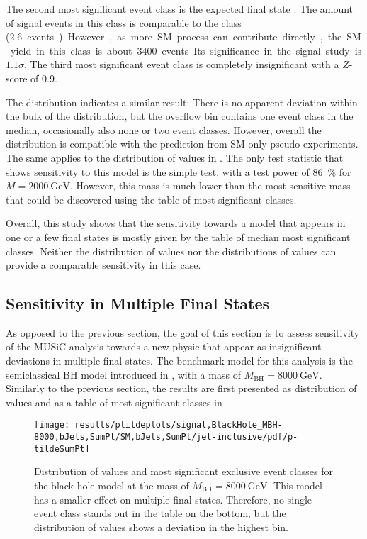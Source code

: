 The second most significant event class is the expected final state . The amount of signal events in this class is comparable to the  class (\SI{2.6} events). However, as more \ac{SM} process can contribute directly, the \ac{SM} yield in this class is about \num{3400} events. Its significance in the signal study is $\num{1.1}\sigma$. 
The third most significant event class is completely insignificant with a $Z$-score of \num{0.9}.

The \ptilde distribution indicates a similar result: There is no apparent deviation within the bulk of the distribution, but the overflow bin contains one event class in the median, occasionally also none or two event classes. However, overall the distribution is compatible with the prediction from \ac{SM}-only pseudo-experiments.
The same applies to the distribution of \TSphat values in . The only test statistic that shows sensitivity to this model is the simple test, with a test power of \SI{86}{\percent} for $M = \SI{2000}{\GeV}$. However, this mass is much lower than the most sensitive mass that could be discovered using the table of most significant classes.

Overall, this study shows that the sensitivity towards a model that appears in one or a few final states is mostly given by the table of median most significant classes. Neither the distribution of \ptilde values nor the distributions of \TSphat values can provide a comparable sensitivity in this case.

\subsection{Sensitivity in Multiple Final States}
As opposed to the previous section, the goal of this section is to assess sensitivity of the \ac{MUSiC} analysis towards a new physic that appear as insignificant deviations in multiple final states. The benchmark model for this analysis is the semiclassical \acl{BH} model introduced in , with a mass of $M_\text{BH} = \SI{8000}{\GeV}$.
Similarly to the previous section, the results are first presented as distribution of \ptilde values and as a table of most significant classes in .

\begin{figure}
    \centering
    \texttt{[image: results/ptildeplots/signal,BlackHole\_MBH-8000,bJets,SumPt/SM,bJets,SumPt/jet-inclusive/pdf/p-tildeSumPt]}
    {
        
    }
    \caption{Distribution of \ptilde values and most significant exclusive event classes for the black hole model at the mass of $M_\text{BH} = \SI{8000}{\GeV}$. This model has a smaller effect on multiple final states. Therefore, no single event class stands out in the table on the bottom, but the distribution of \ptilde values shows a deviation in the highest bin.}
    \label{fig:multiple_final_states}
\end{figure}

